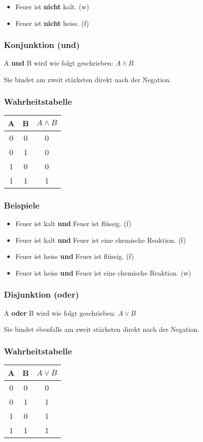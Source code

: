\documentclass[a4paper,12pt]{article}
\begin{document}
\begin{itemize}
  \item Feuer ist \textbf{nicht} kalt. (w)
  \item Feuer ist \textbf{nicht} heiss. (f)
\end{itemize}

\subsubsection{Konjunktion (und)}
A \textbf{und} B wird wie folgt geschrieben: \( A \land B \)

Sie bindet am zweit stärksten direkt nach der Negation.
\subsubsection*{Wahrheitstabelle}
\begin{tabular}{c|c || c}
  A & B & \( A \land B \) \\
  \hline
  0 & 0 & 0 \\
  0 & 1 & 0\\
  1 & 0 & 0\\
  1 & 1 & 1\\
\end{tabular}

\subsubsection*{Beispiele}

\begin{itemize}
  \item Feuer ist kalt \textbf{und} Feuer ist flüssig. (f)
  \item Feuer ist kalt \textbf{und} Feuer ist eine chemische Reaktion. (f)
  \item Feuer ist heiss \textbf{und} Feuer ist flüssig. (f)
  \item Feuer ist heiss \textbf{und} Feuer ist eine chemische Reaktion. (w)
\end{itemize}


\subsubsection{Disjunktion (oder)}
A \textbf{oder} B wird wie folgt geschrieben: \( A \lor B \)

Sie bindet ebenfalls am zweit stärksten direkt nach der Negation.
\subsubsection*{Wahrheitstabelle}
\begin{tabular}{c|c || c}
  A & B & \( A \lor B \) \\
  \hline
  0 & 0 & 0 \\
  0 & 1 & 1\\
  1 & 0 & 1\\
  1 & 1 & 1\\
\end{tabular}\break
\end{document}
